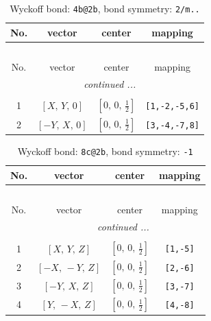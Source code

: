 \documentclass[fleqn,8pt]{jsarticle}
\begin{document}
\begin{longtable}{cccc}
\caption{Wyckoff bond: {\tt 4b@2b}, bond symmetry: {\tt 2/m..}}
 \\
 \hline \hline
No. & vector & center & mapping \\ \hline \endfirsthead

\multicolumn{3}{l}{\tablename\ \thetable{}} \\
 \hline \hline
No. & vector & center & mapping \\ \hline \endhead

 \hline \hline
\multicolumn{3}{r}{\footnotesize\it continued ...} \\ \endfoot

 \hline \hline
\multicolumn{3}{r}{} \\ \endlastfoot

1 & $\left[ X,\, Y,\, 0 \right]$ & $\left[ 0,\, 0,\, \frac{1}{2} \right]$ & {\tt [1,-2,-5,6]} \\ \hline
2 & $\left[ - Y,\, X,\, 0 \right]$ & $\left[ 0,\, 0,\, \frac{1}{2} \right]$ & {\tt [3,-4,-7,8]} \\
\end{longtable}
\renewcommand{\arraystretch}{1.2}
\begin{longtable}{cccc}
\caption{Wyckoff bond: {\tt 8c@2b}, bond symmetry: {\tt -1}}
 \\
 \hline \hline
No. & vector & center & mapping \\ \hline \endfirsthead

\multicolumn{3}{l}{\tablename\ \thetable{}} \\
 \hline \hline
No. & vector & center & mapping \\ \hline \endhead

 \hline \hline
\multicolumn{3}{r}{\footnotesize\it continued ...} \\ \endfoot

 \hline \hline
\multicolumn{3}{r}{} \\ \endlastfoot

1 & $\left[ X,\, Y,\, Z \right]$ & $\left[ 0,\, 0,\, \frac{1}{2} \right]$ & {\tt [1,-5]} \\ \hline
2 & $\left[ - X,\, - Y,\, Z \right]$ & $\left[ 0,\, 0,\, \frac{1}{2} \right]$ & {\tt [2,-6]} \\ \hline
3 & $\left[ - Y,\, X,\, Z \right]$ & $\left[ 0,\, 0,\, \frac{1}{2} \right]$ & {\tt [3,-7]} \\ \hline
4 & $\left[ Y,\, - X,\, Z \right]$ & $\left[ 0,\, 0,\, \frac{1}{2} \right]$ & {\tt [4,-8]} \\
\end{longtable}
\end{document}
